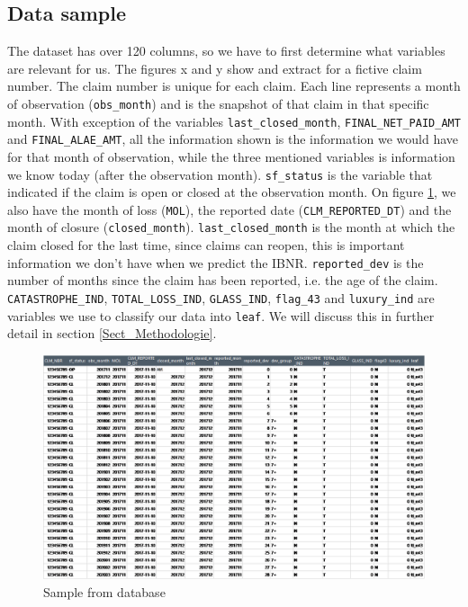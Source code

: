 	\subsection{Data sample}
	The dataset has over 120 columns, so we have to first determine what variables are relevant for us.  The figures x and y show and extract for a fictive claim number. The claim number is unique for each claim. Each line represents a month of observation (\texttt{obs\_month}) and is the snapshot of that claim in that specific month. With exception of the variables \texttt{last\_closed\_month}, \texttt{FINAL\_NET\_PAID\_AMT} and \texttt{FINAL\_ALAE\_AMT}, all the information shown is the information we would have for that month of observation, while the three mentioned variables is information we know today (after the observation month). \texttt{sf\_status} is the variable that indicated if the claim is open or closed at the observation month. On figure \ref{Fig_sample_1}, we also have the month of loss (\texttt{MOL}), the reported date (\texttt{CLM\_REPORTED\_DT}) and the month of closure (\texttt{closed\_month}). \texttt{last\_closed\_month} is the month at which the claim closed for the last time, since claims can reopen, this is important information we don’t have when we predict the IBNR.  \texttt{reported\_dev} is the number of months since the claim has been reported, i.e. the age of the claim. \texttt{CATASTROPHE\_IND}, \texttt{TOTAL\_LOSS\_IND}, \texttt{GLASS\_IND}, \texttt{flag\_43} and \texttt{luxury\_ind} are variables we use to classify our data into \texttt{leaf}. We will discuss this in further detail in section \ref{Sect_Methodologie}. 
	
	\begin{figure}[H]
		\begin{center}
			\includegraphics[scale=0.4]{Graphiques/sample_1} 
			\renewcommand{\figurename}{Figure}
			\caption{Sample from database}\label{Fig_sample_1}
		\end{center}
	\end{figure}
	
